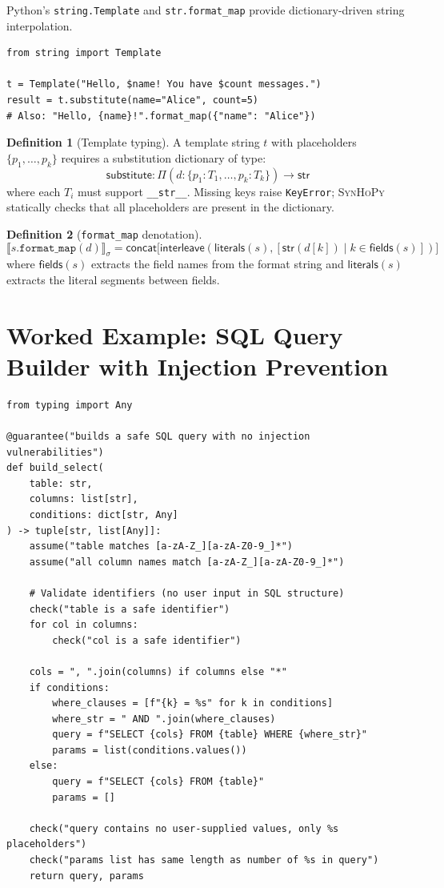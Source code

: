 \documentclass[11pt,a4paper]{report}
\theoremstyle{definition}
\newtheorem{definition}{Definition}[chapter]
\theoremstyle{plain}
\newcommand{\den}[1]{\llbracket #1 \rrbracket}
\newcommand{\synhopy}{\textsc{SynHoPy}}
\begin{document}
Python's \texttt{string.Template} and \texttt{str.format\_map} provide
dictionary-driven string interpolation.

\begin{lstlisting}[style=python]
from string import Template

t = Template("Hello, $name! You have $count messages.")
result = t.substitute(name="Alice", count=5)
# Also: "Hello, {name}!".format_map({"name": "Alice"})
\end{lstlisting}

\begin{definition}[Template typing]
A template string $t$ with placeholders $\{p_1, \ldots, p_k\}$ requires
a substitution dictionary of type:
\[
  \mathsf{substitute} : \Pi(d : \{p_1 : T_1, \ldots, p_k : T_k\}) \to \mathsf{str}
\]
where each $T_i$ must support \texttt{\_\_str\_\_}.  Missing keys raise
\texttt{KeyError}; \synhopy{} statically checks that all placeholders are
present in the dictionary.
\end{definition}

\begin{definition}[\texttt{format\_map} denotation]
\[
  \den{s.\texttt{format\_map}(d)}_\sigma =
  \mathsf{concat}\bigl[\mathsf{interleave}(\mathsf{literals}(s),
    [\mathsf{str}(d[k]) \mid k \in \mathsf{fields}(s)])\bigr]
\]
where $\mathsf{fields}(s)$ extracts the field names from the format string
and $\mathsf{literals}(s)$ extracts the literal segments between fields.
\end{definition}

\section{Worked Example: SQL Query Builder with Injection Prevention}

\begin{lstlisting}[style=synhopy]
from typing import Any

@guarantee("builds a safe SQL query with no injection vulnerabilities")
def build_select(
    table: str,
    columns: list[str],
    conditions: dict[str, Any]
) -> tuple[str, list[Any]]:
    assume("table matches [a-zA-Z_][a-zA-Z0-9_]*")
    assume("all column names match [a-zA-Z_][a-zA-Z0-9_]*")

    # Validate identifiers (no user input in SQL structure)
    check("table is a safe identifier")
    for col in columns:
        check("col is a safe identifier")

    cols = ", ".join(columns) if columns else "*"
    if conditions:
        where_clauses = [f"{k} = %s" for k in conditions]
        where_str = " AND ".join(where_clauses)
        query = f"SELECT {cols} FROM {table} WHERE {where_str}"
        params = list(conditions.values())
    else:
        query = f"SELECT {cols} FROM {table}"
        params = []

    check("query contains no user-supplied values, only %s placeholders")
    check("params list has same length as number of %s in query")
    return query, params
\end{lstlisting}
\end{document}
